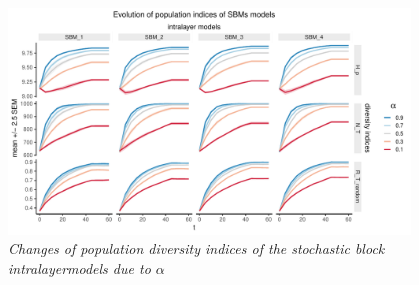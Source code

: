 \begin{figure}[H]
    \centering
    \includegraphics[width=0.95\textwidth,center]{../figures/report/FigS4.pdf}
    \caption{\label{supp:4}
    \textit{Changes of population diversity indices of the stochastic block intralayermodels  due  to $\alpha$}
    }
\end{figure}